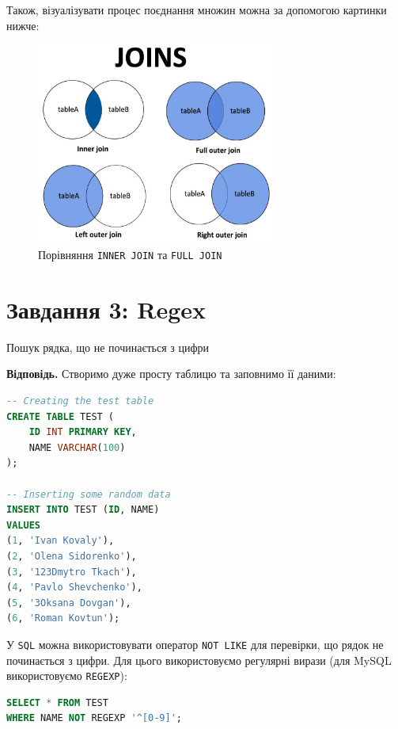 \documentclass{hw_template}
\begin{document}
Також, візуалізувати процес поєднання множин можна за допомогою картинки нижче:
\begin{figure}
    \centering
    \includegraphics[width=0.7\textwidth]{joins.jpg}
    \caption{Порівняння \texttt{INNER JOIN} та \texttt{FULL JOIN}}
\end{figure}

\newpage 

\section{Завдання 3: Regex}

\begin{problem}
    Пошук рядка, що не починається з цифри
\end{problem}

\textbf{Відповідь.} Створимо дуже просту таблицю та заповнимо її даними:

\begin{lstlisting}[language=SQL]
-- Creating the test table
CREATE TABLE TEST (
    ID INT PRIMARY KEY,
    NAME VARCHAR(100)
);

-- Inserting some random data
INSERT INTO TEST (ID, NAME)
VALUES
(1, 'Ivan Kovaly'),
(2, 'Olena Sidorenko'),
(3, '123Dmytro Tkach'),
(4, 'Pavlo Shevchenko'),
(5, '3Oksana Dovgan'),
(6, 'Roman Kovtun');
\end{lstlisting}

У \texttt{SQL} можна використовувати оператор \texttt{NOT LIKE} для перевірки,
що рядок не починається з цифри. Для цього використовуємо регулярні вирази (для 
MySQL використовуємо \texttt{REGEXP}):
\begin{lstlisting}[language=SQL]
SELECT * FROM TEST
WHERE NAME NOT REGEXP '^[0-9]';
\end{lstlisting}
\end{document}
